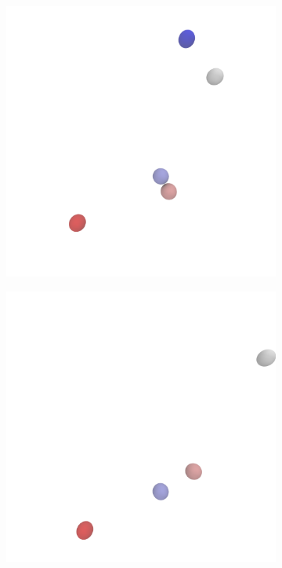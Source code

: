 \documentclass[a4paper,10pt,bibtotoc]{scrartcl}
\begin{document}
\begin{figure}
\begin{subfigure}[t]{.5\textwidth}
        \centering
        \caption{}
        \includegraphics[width=.8\linewidth]{scene3.png}
        \label{fig:sfig1}
    \end{subfigure}\hfill %
    \begin{subfigure}[t]{.5\textwidth}
        \centering
        \caption{}
        \includegraphics[width=.8\linewidth]{scene4.png}
        \label{fig:sfig1}
    \end{subfigure}
    \begin{subfigure}[t]{.5\textwidth}
        \centering
        \caption{}

\end{subfigure}
\end{figure}
\end{document}
